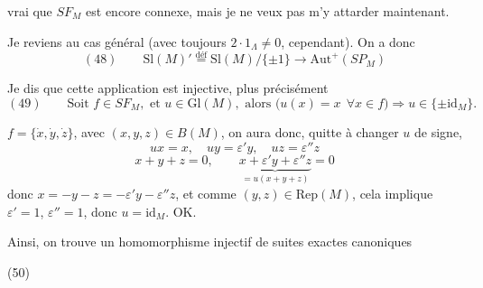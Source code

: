 \documentclass[11pt,a4paper]{article}
\begin{document}

 vrai que $SF_M$ est encore connexe, mais je ne veux pas m'y attarder maintenant.

Je reviens au cas général (avec toujours $2\cdot 1_\Lambda \neq 0$, cependant). On a donc
\[
(48)\qquad \mathrm{Sl}(M)' \overset{\text{déf}}{=} \mathrm{Sl}(M)/\{\pm 1\} \longrightarrow \mathrm{Aut}^{+}(SP_M)
\]

Je dis que cette application est injective,   plus précisément
\[
(49)\qquad \text{Soit } f \in SF_M, \text{ et } u \in \mathrm{Gl}(M), \text{ alors }
\bigl(u(x) = x \ \ \forall x \in f\bigr) \Longrightarrow u \in \{\pm \mathrm{id}_M\}.
\]

 $f = \{\dot x, \dot y, \dot z\}$, avec $(x,y,z) \in B(M)$, on aura donc, quitte à changer $u$ de signe,
\[
ux = x, \quad uy = \varepsilon' y, \quad uz = \varepsilon'' z
\]
\[
x + y + z = 0, \qquad \underbrace{x + \varepsilon' y + \varepsilon'' z}_{= u(x+y+z)} = 0
\]
donc $x = -y - z = -\varepsilon' y - \varepsilon'' z$, et comme $(y,z) \in \mathrm{Rep}(M)$, cela implique $\varepsilon' = 1$, $\varepsilon'' = 1$, donc $u = \mathrm{id}_M$. OK.

Ainsi, on trouve un homomorphisme injectif de suites exactes canoniques

(50)



\end{document}
